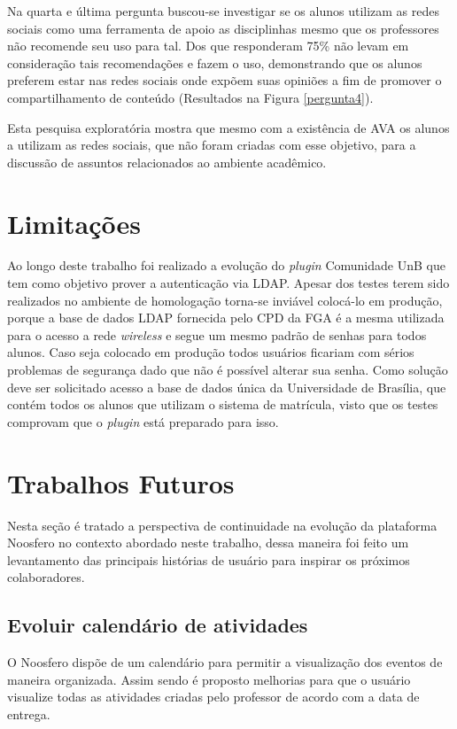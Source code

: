 Na quarta e última pergunta buscou-se investigar se os alunos utilizam as redes sociais como uma ferramenta de apoio as disciplinhas mesmo que os professores não recomende seu uso para tal. Dos que responderam 75\% não levam em consideração tais recomendações e fazem o uso, demonstrando que os alunos preferem estar nas redes sociais onde expõem suas opiniões a fim de promover o compartilhamento de conteúdo (Resultados na Figura \ref{pergunta4}).

Esta pesquisa exploratória mostra que mesmo com a existência de AVA os alunos a utilizam as redes sociais, que não foram criadas com esse objetivo, para a discussão de assuntos relacionados ao ambiente acadêmico.

\section{Limitações}

Ao longo deste trabalho foi realizado a evolução do \textit{plugin} Comunidade UnB que tem como objetivo prover a autenticação via LDAP. Apesar dos testes terem sido realizados no ambiente de homologação torna-se inviável colocá-lo em produção, porque a base de dados LDAP fornecida pelo CPD da FGA é a mesma utilizada para o acesso a rede \textit{wireless} e segue um mesmo padrão de senhas para todos alunos. Caso seja colocado em produção todos usuários ficariam com sérios problemas de segurança dado que não é possível alterar sua senha. Como solução deve ser solicitado acesso a base de dados única da Universidade de Brasília, que contém todos os alunos que utilizam o sistema de matrícula, visto que os testes comprovam que o \textit{plugin} está preparado para isso.

\section{Trabalhos Futuros}

Nesta seção é tratado a perspectiva de continuidade na evolução da plataforma Noosfero no contexto abordado neste trabalho, dessa maneira foi feito um levantamento das principais histórias de usuário para inspirar os próximos colaboradores.

\subsection{Evoluir calendário de atividades}

O Noosfero dispõe de um calendário para permitir a visualização dos eventos de maneira organizada. Assim sendo é proposto melhorias para que o usuário visualize todas as atividades criadas pelo professor de acordo com a data de entrega.


